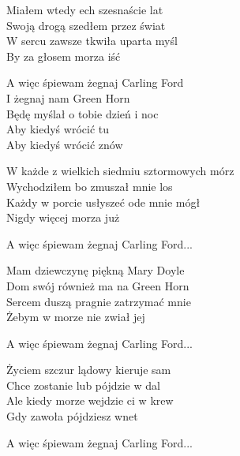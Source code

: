 \begin{text}
    Miałem wtedy ech szesnaście lat\\
    Swoją drogą szedłem przez świat \\
    W sercu zawsze tkwiła uparta myśl \\
    By za głosem morza iść
	
    \vin A więc śpiewam żegnaj Carling Ford \\
    \vin I żegnaj nam Green Horn \\
    \vin Będę myślał o tobie dzień i noc \\
    \vin Aby kiedyś wrócić tu \\
    \vin Aby kiedyś wrócić znów 

    W każde z wielkich siedmiu sztormowych mórz\\
    Wychodziłem bo zmuszał mnie los\\
    Każdy w porcie usłyszeć ode mnie mógł\\
    Nigdy więcej morza już
    
    \vin A więc śpiewam żegnaj Carling Ford...
	
    Mam dziewczynę piękną Mary Doyle\\
    Dom swój również ma na Green Horn\\
    Sercem duszą pragnie zatrzymać mnie\\
    Żebym w morze nie zwiał jej
    
    \vin A więc śpiewam żegnaj Carling Ford...
	
    Życiem szczur lądowy kieruje sam\\
    Chce zostanie lub pójdzie w dal\\
    Ale kiedy morze wejdzie ci w krew\\
    Gdy zawoła pójdziesz wnet
    
    \vin A więc śpiewam żegnaj Carling Ford...

\end{text}
